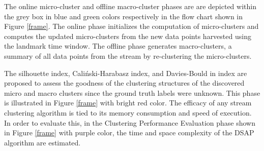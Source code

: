 \documentclass[../UNBThesis2.tex]{subfiles}
\begin{document}
The online micro-cluster and offline macro-cluster phases are are depicted within the grey box in blue and green colors respectively in the flow chart shown in Figure \ref{frame}. The online phase initializes the computation of micro-clusters and computes the updated micro-clusters from the new data points harvested using the landmark time window. The offline phase generates macro-clusters, a summary of all data points from the stream by re-clustering the micro-clusters. 

The silhouette index, Caliński-Harabasz index, and Davies-Bould in index are proposed to assess the goodness of  the clustering structures of the discovered micro and macro clusters since the ground truth labels were unknown. This phase is illustrated in Figure \ref{frame} with bright red color. The efficacy of any stream clustering algorithm is tied to its memory consumption and speed of execution. In order to evaluate this, in the Clustering Performance Evaluation phase shown in Figure \ref{frame} with purple color, the time and space complexity of the DSAP algorithm are estimated. 
























\end{document}
